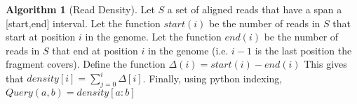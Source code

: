 
% 


\theoremstyle{definition}
\newtheorem{definition}{Algorithm}

\begin{definition}[Read Density] \label{algo1}
Let $S$ a set of aligned reads that have a span a [start,end] interval. Let the function $start(i)$ be the number of reads in $S$ that start at position $i$ in the genome. Let the function $end(i)$ be the number of reads in $S$ that end at position $i$ in the genome (i.e. $i-1$ is the last position the fragment covers). Define the function $\Delta(i) = start(i) - end(i)$ This gives that $density[i] = \sum\limits_{j=0}^i \Delta[i]$. Finally, using python indexing, $Query(a, b) = density[a:b]$


\end{definition}

